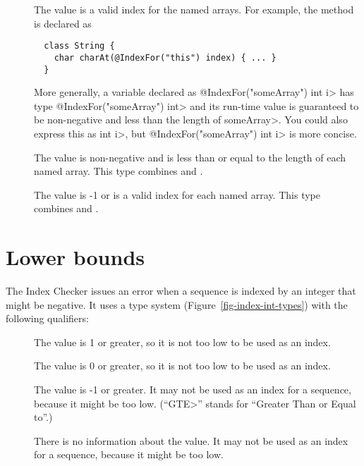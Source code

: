 \begin{description}
\item[]
  The value is a valid index for the named arrays.  For example, the
  method is declared as

  \begin{Verbatim}
  class String {
    char charAt(@IndexFor("this") index) { ... }
  }
  \end{Verbatim}

  More generally, a variable
  declared as \<@IndexFor("someArray") int i> has type
  \<@IndexFor("someArray") int> and its run-time value is guaranteed to be
  non-negative and less than the length of \<someArray>.  You could also
  express this as
  \<
  int i>,
  but \<@IndexFor("someArray") int i> is more concise.

 \item[]
   The value is non-negative and is less than or equal to the length of
   each named array.  This type combines
   and
  .

 \item[]
   The value is -1 or is a valid index for
   each named array.  This type combines
   and
  .
\end{description}

\section{Lower bounds\label{index-lowerbound}}

The Index Checker issues an error when
a sequence is indexed by an integer that might be negative.
It uses a type system (Figure~\ref{fig-index-int-types}) with the following
qualifiers:

\begin{description}
\item[]
  The value is 1 or greater, so it is not too low to be used as an index.
\item[]
  The value is 0 or greater, so it is not too low to be used as an index.
\item[]
  The value is -1 or greater.
  It may not be used as an index for a sequence, because it might be too low.
  (``\<GTE>'' stands for ``Greater Than or Equal to''.)
\item[]
  There is no information about the value.
  It may not be used as an index for a sequence, because it might be too low.
\end{description}

